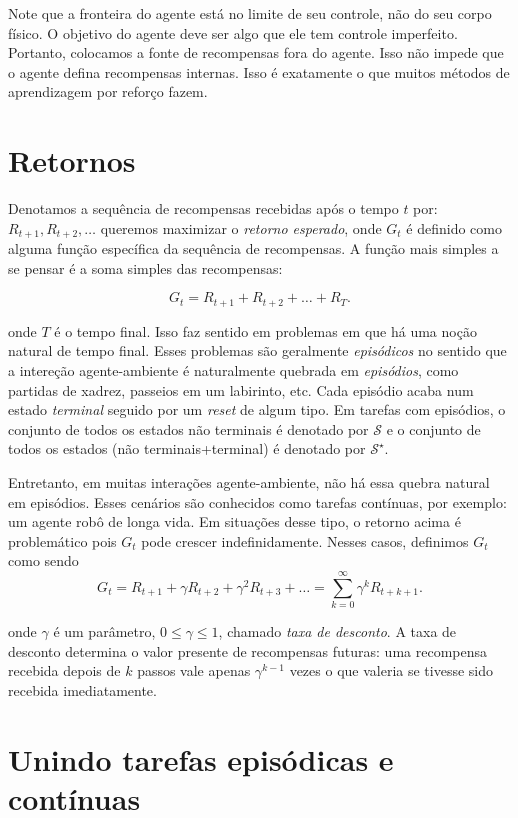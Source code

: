 \documentclass{article}
\begin{document}
Note que a fronteira do agente está no limite de seu controle, não do seu corpo físico. O objetivo do agente deve ser algo que ele tem controle imperfeito. Portanto, colocamos a fonte de recompensas fora do agente. Isso não impede que o agente defina recompensas internas. Isso é exatamente o que muitos métodos de aprendizagem por reforço fazem.

\section{Retornos}

Denotamos a sequência de recompensas recebidas após o tempo $t$ por: $R_{t+1},R_{t+2},\ldots$ queremos maximizar o \textit{retorno esperado}, onde $G_t$ é definido como alguma função específica da sequência de recompensas. A função mais simples a se pensar é a soma simples das recompensas:

\[
  G_t=R_{t+1}+R_{t+2}+\ldots+R_T
.\] 

onde $T$ é o tempo final. Isso faz sentido em problemas em que há uma noção natural de tempo final. Esses problemas são geralmente \textit{episódicos} no sentido que a intereção agente-ambiente é naturalmente quebrada em \textit{episódios}, como partidas de xadrez, passeios em um labirinto, etc. Cada episódio acaba num estado \textit{terminal} seguido por um \textit{reset} de algum tipo. Em tarefas com episódios, o conjunto de todos os estados não terminais é denotado por $\mathcal{S}$ e o conjunto de todos os estados (não terminais+terminal) é denotado por $\mathcal{S}^{\star}$.

Entretanto, em muitas interações agente-ambiente, não há essa quebra natural em episódios. Esses cenários são conhecidos como tarefas contínuas, por exemplo: um agente robô de longa vida. Em situações desse tipo, o retorno acima é problemático pois $G_t$ pode crescer indefinidamente. Nesses casos, definimos $G_t$ como sendo \[
  G_t=R_{t+1}+\gamma R_{t+2} + {\gamma}^2R_{t+3}+\ldots=\sum_{k=0}^{\infty} {\gamma}^k R_{t+k+1}
.\] 

onde $\gamma$ é um parâmetro, $0 \le \gamma \le 1$, chamado \textit{taxa de desconto}. A taxa de desconto determina o valor presente de recompensas futuras: uma recompensa recebida depois de $k$ passos vale apenas ${\gamma}^{k-1}$ vezes o que valeria se tivesse sido recebida imediatamente.


\section{Unindo tarefas episódicas e contínuas}
\end{document}
